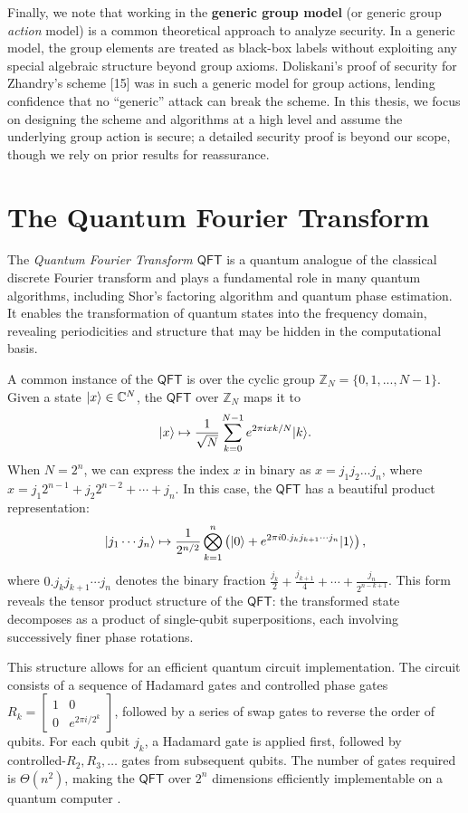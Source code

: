 \documentclass[12pt]{report}
\newcommand{\qft}{\mathsf{QFT}}
\begin{document}
Finally, we note that working in the \textbf{generic group model} (or generic group \emph{action} model) is a common theoretical approach to analyze security. In a generic model, the group elements are treated as black-box labels without exploiting any special algebraic structure beyond group axioms. Doliskani’s proof of security for Zhandry’s scheme [15] was in such a generic model for group actions, lending confidence that no “generic” attack can break the scheme. In this thesis, we focus on designing the scheme and algorithms at a high level and assume the underlying group action is secure; a detailed security proof is beyond our scope, though we rely on prior results for reassurance.








\section{The Quantum Fourier Transform}
The \textit{Quantum Fourier Transform $\qft$} is a quantum analogue of the classical discrete Fourier transform and plays a fundamental role in many quantum algorithms, including Shor’s factoring algorithm and quantum phase estimation. It enables the transformation of quantum states into the frequency domain, revealing periodicities and structure that may be hidden in the computational basis.

A common instance of the $\qft$ is over the cyclic group \( \mathbb{Z}_N  = \{0,1,...,N-1\}\). Given a state \( \lvert x\rangle \in \mathbb{C}^N \), the $\qft$ over \( \mathbb{Z}_N \) maps it to
\[
\lvert x\rangle \mapsto \frac{1}{\sqrt{N}} \sum_{k=0}^{N-1} e^{2\pi i xk / N} \lvert k\rangle.
\]
When \( N = 2^n \), we can express the index \( x \) in binary as \( x = j_1 j_2 \ldots j_n \), where \( x = j_1 2^{n-1} + j_2 2^{n-2} + \cdots + j_n \). In this case, the $\qft$ has a beautiful product representation:
\[
\lvert j_1 \cdots j_n\rangle \mapsto \frac{1}{2^{n/2}} \bigotimes_{k=1}^n \left( \lvert0\rangle + e^{2\pi i 0.j_k j_{k+1} \cdots j_n} \lvert1\rangle \right),
\]
where \( 0.j_k j_{k+1} \cdots j_n \) denotes the binary fraction \( \frac{j_k}{2} + \frac{j_{k+1}}{4} + \cdots + \frac{j_n}{2^{n-k+1}} \). This form reveals the tensor product structure of the $\qft$: the transformed state decomposes as a product of single-qubit superpositions, each involving successively finer phase rotations.

This structure allows for an efficient quantum circuit implementation. The circuit consists of a sequence of Hadamard gates and controlled phase gates \( R_k = \begin{bmatrix} 1 & 0 \\ 0 & e^{2\pi i / 2^k} \end{bmatrix} \), followed by a series of swap gates to reverse the order of qubits. For each qubit \( j_k \), a Hadamard gate is applied first, followed by controlled-\( R_2, R_3, \ldots \) gates from subsequent qubits. The number of gates required is \( \Theta(n^2) \), making the $\qft$ over \( 2^n \) dimensions efficiently implementable on a quantum computer \cite[Section 5.1]{NielsenChuang2010}.
\end{document}
